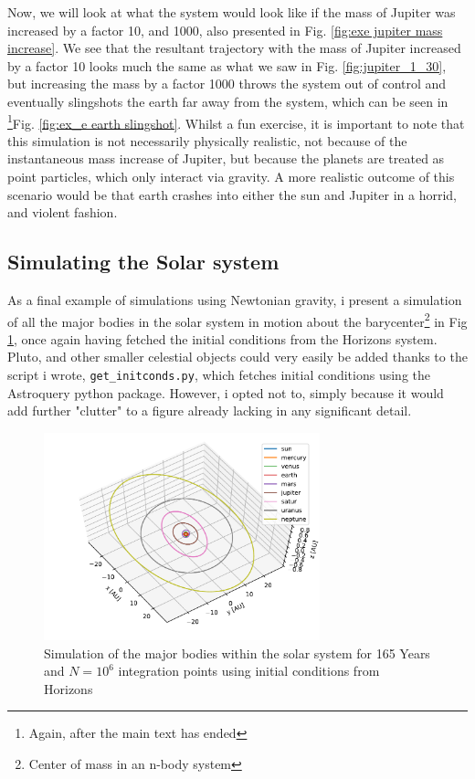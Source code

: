 \documentclass[10pt,showpacs,preprintnumbers,amsmath,amssymb,nofootinbib,aps,prl,twocolumn,groupedaddress,superscriptaddress,showkeys]{revtex4-1}
\begin{document}
  \newpage

  Now, we will look at what the system would look like if the mass of Jupiter was increased by a factor 10, and 1000, also presented in Fig. \ref{fig:exe jupiter mass increase}. We see that the resultant trajectory with the mass of Jupiter increased by a factor 10 looks much the same as what we saw in Fig. \ref{fig:jupiter_1_30}, but increasing the mass by a factor 1000 throws the system out of control and eventually slingshots the earth far away from the system, which can be seen in \footnote{Again, after the main text has ended}Fig. \ref{fig:ex_e earth slingshot}. Whilst a fun exercise, it is important to note that this simulation is not necessarily physically realistic, not because of the instantaneous mass increase of Jupiter, but because the planets are treated as point particles, which only interact via gravity. A more realistic outcome of this scenario would be that earth crashes into either the sun and Jupiter in a horrid, and violent fashion.

\subsection{Simulating the Solar system}
  As a final example of simulations using Newtonian gravity, i present a simulation of all the major bodies in the solar system in motion about the barycenter\footnote{Center of mass in an n-body system} in Fig \ref{fig:solarsystem}, once again having fetched the initial conditions from the Horizons system.
  Pluto, and other smaller celestial objects could very easily be added thanks to the script i wrote, \lstinline{get_initconds.py}, which fetches initial conditions using the Astroquery python package. However, i opted not to, simply because it would add further "clutter" to a figure already lacking in any significant detail.


\begin{figure}[H]
  \center
  \includegraphics[width=8cm]{figs/all_bodies.pdf}
  \caption{Simulation of the major bodies within the solar system for 165 Years and $N=10^6$ integration points using initial conditions from Horizons}
  \label{fig:solarsystem}
\end{figure}
\end{document}
